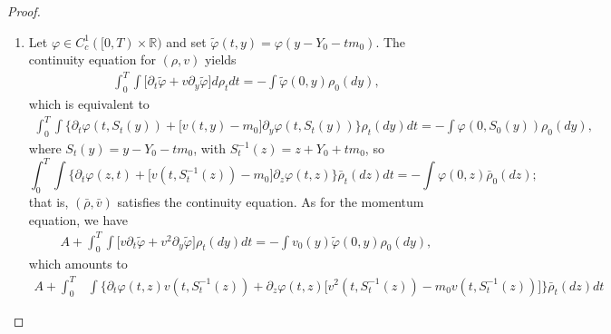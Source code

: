 \documentclass[11pt]{article}
\numberwithin{equation}{section}
\begin{document}
\begin{proof}
\begin{enumerate}
            \item Let $\varphi\in C_c^1([0,T)\times\mathbb{R})$ and set $\tilde{\varphi}(t,y)=\varphi(y-Y_0-tm_0)$. The continuity equation for $(\rho,v)$ yields 
            \begin{align*}
            \int_0^T \!\! \int\big[\partial_t\tilde{\varphi}+v\partial_y\tilde{\varphi}\big]d\rho_tdt=-\int\tilde{\varphi}(0,y)\rho_0(dy),
            \end{align*}
            which is equivalent to 
            \begin{align}\nonumber
                \int_0^T \!\! \int\big\{\partial_t\varphi(t,S_t(y))+\big[v(t,y)-m_0\big]\partial_y\varphi(t,S_t(y))\big\}\rho_t(dy)dt=-\int\varphi(0,S_0(y))\rho_0(dy),
            \end{align}
            where $S_t(y)=y-Y_0-tm_0$, with $S_t^{-1}(z)=z+Y_0+tm_0$, so 
            \begin{equation}\label{new-cont-eq}
                \int_0^T \!\! \int\big\{\partial_t\varphi(z,t)+\big[v(t,S_t^{-1}(z))-m_0\big]\partial_z\varphi(t,z)\big\}\bar{\rho}_t(dz)dt=-\int\varphi(0,z)\bar{\rho}_0(dz);
            \end{equation}
            that is, $(\bar{\rho},\bar{v})$ satisfies the continuity equation. As for the momentum equation, we have 
            \begin{align*}
                A+\int_0^T \!\! \int\big[v\partial_t\tilde{\varphi}+v^2\partial_y\tilde{\varphi}\big]\rho_t(dy)dt=-\int v_0(y)\tilde{\varphi}(0,y)\rho_0(dy),
            \end{align*}
            which amounts to
            \begin{align*}
                A+\int_0^T& \!\! \int\big\{\partial_t\varphi(t,z)v(t,S_t^{-1}(z))+\partial_z\varphi (t,z)\big[v^2(t,S_t^{-1}(z))-m_0v(t,S_t^{-1}(z))\big]\big\}\bar\rho_t(dz)dt

\end{align*}
\end{enumerate}
\end{proof}
\end{document}
